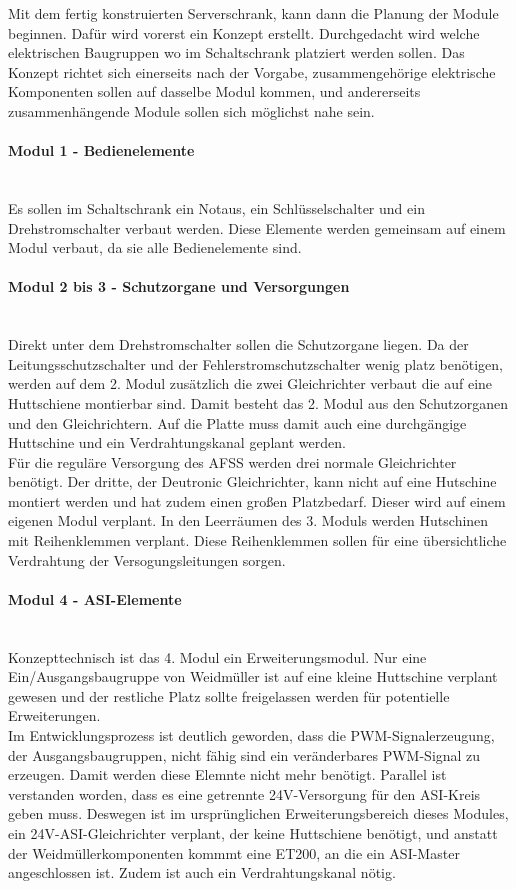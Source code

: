     Mit dem fertig konstruierten Serverschrank, kann dann die Planung der Module beginnen. Dafür wird vorerst ein Konzept erstellt. Durchgedacht wird welche elektrischen Baugruppen wo im Schaltschrank platziert werden sollen. Das Konzept richtet sich einerseits nach der Vorgabe, zusammengehörige elektrische Komponenten sollen auf dasselbe Modul kommen, und andererseits zusammenhängende Module sollen sich möglichst nahe sein. 
    \paragraph{Modul 1 - Bedienelemente}\mbox{}\\
    Es sollen im Schaltschrank ein Notaus, ein Schlüsselschalter und ein Drehstromschalter verbaut werden. Diese Elemente werden gemeinsam auf einem Modul verbaut, da sie alle Bedienelemente sind.
    \paragraph{Modul 2 bis 3 - Schutzorgane und Versorgungen}\mbox{}\\
    Direkt unter dem Drehstromschalter sollen die Schutzorgane liegen. Da der Leitungsschutzschalter und der Fehlerstromschutzschalter wenig platz benötigen, werden auf dem 2. Modul zusätzlich die zwei Gleichrichter verbaut die auf eine Huttschiene montierbar sind. Damit besteht das 2. Modul aus den Schutzorganen und den Gleichrichtern. Auf die Platte muss damit auch eine durchgängige Huttschine und ein Verdrahtungskanal geplant werden.\\
    Für die reguläre Versorgung des AFSS werden drei normale Gleichrichter benötigt. Der dritte, der Deutronic Gleichrichter, kann nicht auf eine Hutschine montiert werden und hat zudem einen großen Platzbedarf. Dieser wird auf einem eigenen Modul verplant. In den Leerräumen des 3. Moduls werden Hutschinen mit Reihenklemmen verplant. Diese Reihenklemmen sollen für eine übersichtliche Verdrahtung der Versogungsleitungen sorgen.
    \paragraph{Modul 4 - ASI-Elemente}\mbox{}\\
    Konzepttechnisch ist das 4. Modul ein Erweiterungsmodul. Nur eine Ein/Ausgangsbaugruppe von Weidmüller ist auf eine kleine Huttschine verplant gewesen und der restliche Platz sollte freigelassen werden für potentielle Erweiterungen.\\
    Im Entwicklungsprozess ist deutlich geworden, dass die PWM-Signalerzeugung, der Ausgangsbaugruppen, nicht fähig sind ein veränderbares PWM-Signal zu erzeugen. Damit werden diese Elemnte nicht mehr benötigt. Parallel ist verstanden worden, dass es eine getrennte 24V-Versorgung für den ASI-Kreis geben muss. Deswegen ist im ursprünglichen Erweiterungsbereich dieses Modules, ein 24V-ASI-Gleichrichter verplant, der keine Huttschiene benötigt, und anstatt der Weidmüllerkomponenten kommmt eine ET200, an die ein ASI-Master angeschlossen ist. Zudem ist auch ein Verdrahtungskanal nötig.
